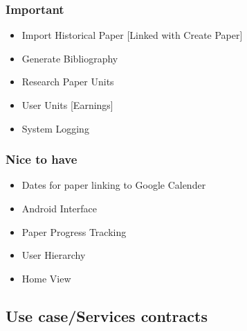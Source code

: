 \documentclass[a4paper,10pt]{article}
\begin{document}
\subsubsection{Important}
	\begin{itemize}
	  	\item Import Historical Paper [Linked with Create Paper]
		\item Generate Bibliography
		\item Research Paper Units
		\item User Units [Earnings]
		\item System Logging 
	\end{itemize}


\subsubsection{Nice to have}
	\begin{itemize}
		\item Dates for paper linking to Google Calender
		\item Android Interface
		\item Paper Progress Tracking
		\item User Hierarchy
		\item Home View
	\end{itemize}

\subsection{Use case/Services contracts}
\end{document}
